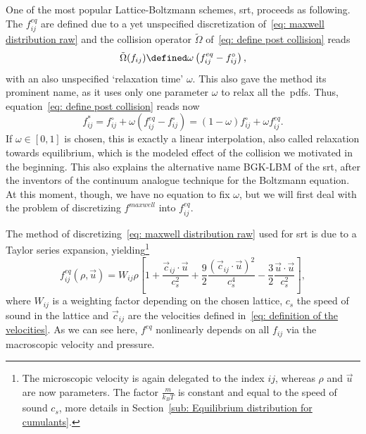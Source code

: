 One of the most popular Lattice-Boltzmann schemes, \gls{srt}, proceeds as following.
The $f_{ij}^{eq}$ are defined due to a yet unspecified discretization of~\eqref{eq: maxwell distribution raw} and the collision operator $\tilde{\Omega}$ of~\eqref{eq: define post collision} reads
\begin{equation}
  \tilde{\Omega}(f_{ij}) \defined \omega \left(f_{ij}^{eq} - f_{ij}^{\circ}\right),
\end{equation}
with an also unspecified `relaxation time' $\omega$.
This also gave the method its prominent name, as it uses only one parameter $\omega$ to relax all the~\glspl{pdf}.
Thus, equation~\eqref{eq: define post collision} reads now
\begin{equation}
  \label{eq: post collision discrete}
  f_{ij}^* = f_{ij}^{\circ} + \omega \left(f_{ij}^{eq} - f_{ij}^{\circ}\right) = (1-\omega)f_{ij}^{\circ} + \omega f_{ij}^{eq}.
\end{equation}
If $\omega\in[0,1]$ is chosen, this is exactly a linear interpolation, also called relaxation towards equilibrium, which is the modeled effect of the collision we motivated in the beginning.
This also explains the alternative name BGK-LBM of the \gls{srt}, after the inventors of the continuum analogue technique for the Boltzmann equation.
At this moment, though, we have no equation to fix $\omega$, but we will first deal with the problem of discretizing $f^{maxwell}$ into $f_{ij}^{eq}$.

The method of discretizing~\eqref{eq: maxwell distribution raw} used for \gls{srt} is due to a Taylor series expansion, yielding\footnote{The microscopic velocity is again delegated to the index $ij$, whereas $\rho$ and $\vec{u}$ are now parameters.
The factor $\frac{m}{k_B T}$ is constant and equal to the speed of sound $c_s$, more details in Section~\ref{sub: Equilibrium distribution for cumulants}.}
\begin{equation}
  \label{eq: equilibrium particle distributions}
  f_{ij}^{eq}(\rho,\vec{u}) = W_{ij}\rho
  \left[
    1
    + \frac{\vec{c}_{ij} \cdot \vec{u}}{c_s^2}
    + \frac{9}{2}\frac{{(\vec{c}_{ij} \cdot \vec{u})}^2}{c_s^4}
    - \frac{3}{2}\frac{\vec{u} \cdot \vec{u}}{c_s^2}
  \right],
\end{equation}
where $W_{ij}$ is a weighting factor depending on the chosen lattice, $c_s$ the speed of sound in the lattice and $\vec{c}_{ij}$ are the velocities defined in~\eqref{eq: definition of the velocities}.
As we can see here, $f^{eq}$ nonlinearly depends on all $f_{ij}$ via the macroscopic velocity and pressure.

